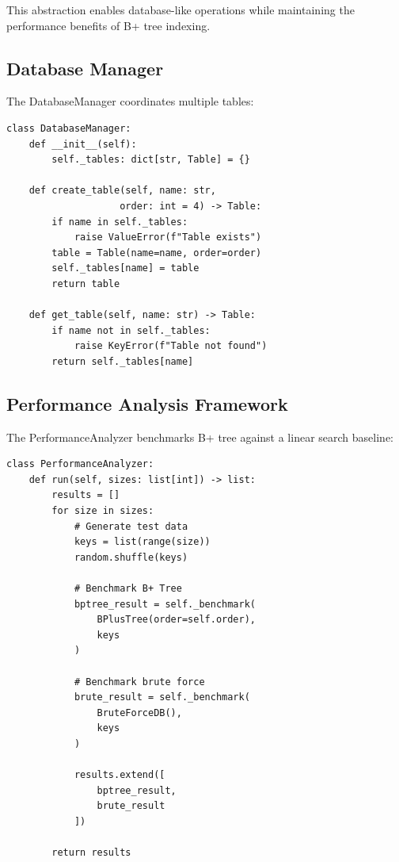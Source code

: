 \documentclass[conference]{IEEEtran}
\begin{document}
This abstraction enables database-like operations while maintaining the performance benefits of B+ tree indexing.

\subsection{Database Manager}

The DatabaseManager coordinates multiple tables:

\begin{lstlisting}[caption=Database Manager]
class DatabaseManager:
    def __init__(self):
        self._tables: dict[str, Table] = {}

    def create_table(self, name: str,
                    order: int = 4) -> Table:
        if name in self._tables:
            raise ValueError(f"Table exists")
        table = Table(name=name, order=order)
        self._tables[name] = table
        return table

    def get_table(self, name: str) -> Table:
        if name not in self._tables:
            raise KeyError(f"Table not found")
        return self._tables[name]
\end{lstlisting}

\subsection{Performance Analysis Framework}

The PerformanceAnalyzer benchmarks B+ tree against a linear search baseline:

\begin{lstlisting}[caption=Performance Benchmarking]
class PerformanceAnalyzer:
    def run(self, sizes: list[int]) -> list:
        results = []
        for size in sizes:
            # Generate test data
            keys = list(range(size))
            random.shuffle(keys)

            # Benchmark B+ Tree
            bptree_result = self._benchmark(
                BPlusTree(order=self.order),
                keys
            )

            # Benchmark brute force
            brute_result = self._benchmark(
                BruteForceDB(),
                keys
            )

            results.extend([
                bptree_result,
                brute_result
            ])

        return results
\end{lstlisting}
\end{document}

